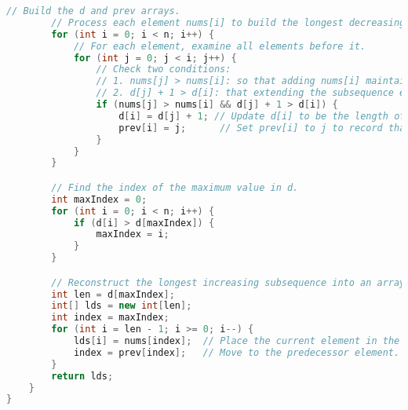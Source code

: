 \documentclass[12pt,letterpaper,final]{report}
\begin{document}
\begin{lstlisting}[language=Java]
        // Build the d and prev arrays.
        // Process each element nums[i] to build the longest decreasing subsequence ending at that index.
        for (int i = 0; i < n; i++) {
            // For each element, examine all elements before it.
            for (int j = 0; j < i; j++) {
                // Check two conditions:
                // 1. nums[j] > nums[i]: so that adding nums[i] maintains a decreasing order.
                // 2. d[j] + 1 > d[i]: that extending the subsequence ending at j produces a longer subsequence than the current known subsequence ending at i
                if (nums[j] > nums[i] && d[j] + 1 > d[i]) {
                    d[i] = d[j] + 1; // Update d[i] to be the length of the new longer subsequence ending at i
                    prev[i] = j;      // Set prev[i] to j to record that the best subsequence ending at i comes from extending the subsequence ending at j
                }
            }
        }

        // Find the index of the maximum value in d.
        int maxIndex = 0;
        for (int i = 0; i < n; i++) {
            if (d[i] > d[maxIndex]) {
                maxIndex = i;
            }
        }

        // Reconstruct the longest increasing subsequence into an array: lds []
        int len = d[maxIndex];
        int[] lds = new int[len];
        int index = maxIndex;
        for (int i = len - 1; i >= 0; i--) {
            lds[i] = nums[index];  // Place the current element in the correct position.
            index = prev[index];   // Move to the predecessor element.
        }
        return lds;
    }
}
\end{lstlisting}
\end{document}
